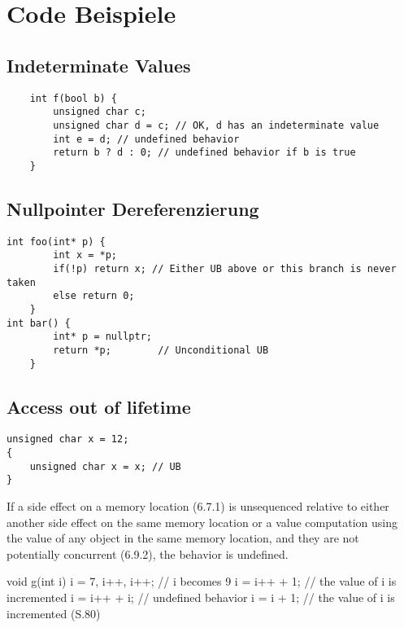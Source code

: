 \lstset{language=cpp}

\section{Code Beispiele}
\label{sec:codebsp}

\subsection{Indeterminate Values}
\label{subsec:indeterminate}
\begin{lstlisting}
    int f(bool b) {
        unsigned char c;
        unsigned char d = c; // OK, d has an indeterminate value
        int e = d; // undefined behavior
        return b ? d : 0; // undefined behavior if b is true
    }
\end{lstlisting}
\cite[S.63 f.]{book:cpp-standard}

\subsection{Nullpointer Dereferenzierung}
\label{subsec:nullpointer}

\begin{lstlisting}
int foo(int* p) {
        int x = *p;
        if(!p) return x; // Either UB above or this branch is never taken
        else return 0;
    }
int bar() {
        int* p = nullptr;
        return *p;        // Unconditional UB
    }
\end{lstlisting}
\cite{misc:cpp-undefined}

\subsection{Access out of lifetime}
\label{subsec:outside-lifetime}

\begin{lstlisting}
unsigned char x = 12;
{ 
    unsigned char x = x; // UB
}
\end{lstlisting}
\cite[S.35]{book:cpp-standard}

If a side effect on a memory location (6.7.1) is unsequenced relative to either another
side effect on the same memory location or a value computation using the value of any object in the same
memory location, and they are not potentially concurrent (6.9.2), the behavior is undefined.

void g(int i) {
        i = 7, i++, i++; // i becomes 9
        i = i++ + 1; // the value of i is incremented
        i = i++ + i; // undefined behavior
        i = i + 1; // the value of i is incremented
    }
(S.80)